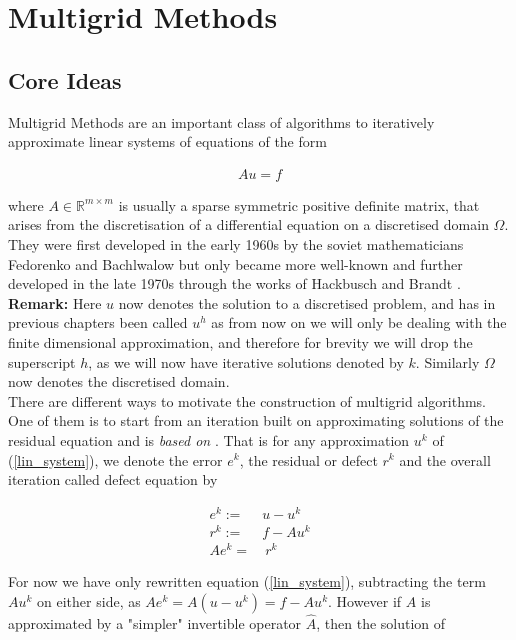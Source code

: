 \documentclass[../draft_1.tex]{subfiles}
\begin{document}
\chapter{Multigrid Methods}

\section{Core Ideas}
Multigrid Methods are an important class of algorithms to iteratively approximate linear systems of equations of the form
 \begin{ceqn}
 	\begin{align}
 	\label{lin_system}
 Au = f 
 	\end{align}
\end{ceqn}

 where $A \in \mathbb{R}^{m \times m}$ is usually a sparse symmetric positive definite matrix, that arises from the discretisation of a differential equation on a discretised domain $\Omega$. They were first developed in the early 1960s by the soviet mathematicians Fedorenko and Bachlwalow but only became more well-known and further developed in the late 1970s through the works of Hackbusch \cite{hackbusch2013multi} and Brandt \cite{brandt1977multi}.
\smallskip
\\
\textbf{Remark:} Here $u$ now denotes the solution to a discretised problem, and has in previous chapters been called $u^h$ as from now on we will only be dealing with the finite dimensional approximation, and therefore for brevity we will drop the superscript $h$, as we will now have iterative solutions denoted by $k$. Similarly $\Omega$ now denotes the discretised domain.
\smallskip
\\
There are different ways to motivate the construction of multigrid algorithms. One of them is to start from an iteration built on approximating solutions of the residual equation and is \textit{based on} \cite{trottenberg2000multigrid}. That is for any approximation $u^k$ of (\ref{lin_system}), we denote the error $e^k$, the residual or defect $r^k$ and the overall iteration called defect equation by
\begin{ceqn}
	\begin{align}
	e^k :=& u - u^k \\
	r^k :=& f - Au^k \\
	\label{defect_equation}
	A e^k =& \ r^k	
	\end{align}
\end{ceqn}
For now we have only rewritten equation (\ref{lin_system}), subtracting the term $Au^k$ on either side, as $A e^k = A( u - u^k) = f - Au^k$. However if $A$ is approximated by a "simpler" invertible operator $\hat{A}$, then the solution of 
\end{document}
